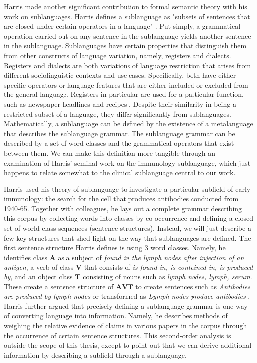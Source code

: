 Harris made another significant contribution to formal semantic theory with his work on sublanguages. Harris defines a sublanguage as "subsets of sentences that are closed under certain operators in a language" \cite{harrisTheoryLanguageInformation1991}. Put simply, a grammatical operation carried out on any sentence in the sublanguage yields another sentence in the sublanguage. Sublanguages have certain properties that distinguish them from other constructs of language variation, namely, registers and dialects. Registers and dialects are both variations of language restriction that arises from different sociolinguistic contexts and use cases. Specifically, both have either specific operators or language features that are either included or excluded from the general language. Registers in particular are used for a particular function, such as newspaper headlines and recipes \cite{zwickyChapterRegisterDimension2015}. Despite their similarity in being a restricted subset of a language, they differ significantly from sublanguages. Mathematically, a sublanguage can be defined by the existence of a metalanguage that describes the sublanguage grammar. The sublanguage grammar can be described by a set of word-classes and the grammatical operators that exist between them. We can make this definition more tangible through an examination of Harris' seminal work on the immunology sublanguage, which just happens to relate somewhat to the clinical sublanguage central to our work. 

Harris used his theory of sublanguage to investigate a particular subfield of early immunology: the search for the cell that produces antibodies conducted from 1940-65. Together with colleagues, he lays out a complete grammar describing this corpus by collecting words into classes by co-occurrence and defining a closed set of world-class sequences (sentence structures).  Instead, we will just describe a few key structures that shed light on the way that sublanguages are defined. The first sentence structure Harris defines is using 3 word classes. Namely, he identifies class $\mathbf{A}$ as a subject of \emph{found in the lymph nodes after injection of an antigen}, a verb of class $\mathbf{V}$ that consists of \emph{is found in, is contained in, is produced by}, and an object class $\mathbf{T}$ consisting of nouns such as \emph{lymph nodes, lymph, serum}. These create a sentence structure of $\mathbf{AVT}$ to create sentences such as \emph{Antibodies are produced by lymph nodes} or transformed as \emph{Lymph nodes produce antibodies} \cite{harris2012form}. Harris further argued that precisely defining a sublanguage grammar is one way of converting language into information. Namely, he describes methods of weighing the relative evidence of claims in various papers in the corpus through the occurrence of certain sentence structures. This second-order analysis is outside the scope of this thesis, except to point out that we can derive additional information by describing a subfield through a sublanguage. 

